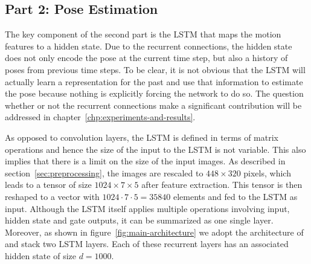 		\subsection{Part 2: Pose Estimation}
			The key component of the second part is the LSTM that maps the motion features to a hidden state.
			Due to the recurrent connections, the hidden state does not only encode the pose at the current time step, but also a history of poses from previous time steps.
			To be clear, it is not obvious that the LSTM will actually learn a representation for the past and use that information to estimate the pose because nothing is explicitly forcing the network to do so.
			The question whether or not the recurrent connections make a significant contribution will be addressed in chapter~\ref{chp:experiments-and-results}.
			
			As opposed to convolution layers, the LSTM is defined in terms of matrix operations and hence the size of the input to the LSTM is not variable.
			This also implies that there is a limit on the size of the input images.
			As described in section~\ref{sec:preprocessing}, the images are rescaled to $448 \times 320$ pixels, which leads to a tensor of size $1024 \times 7 \times 5$ after feature extraction.
			This tensor is then reshaped to a vector with $1024 \cdot 7 \cdot 5 = 35840$ elements and fed to the LSTM as input.
			Although the LSTM itself applies multiple operations involving input, hidden state and gate outputs, it can be summarized as one single layer.
			Moreover, as shown in figure~\ref{fig:main-architecture} we adopt the architecture of~\citeauthor{wang2017deepvo} and stack two LSTM layers.
			Each of these recurrent layers has an associated hidden state of size $d = 1000$.
			
